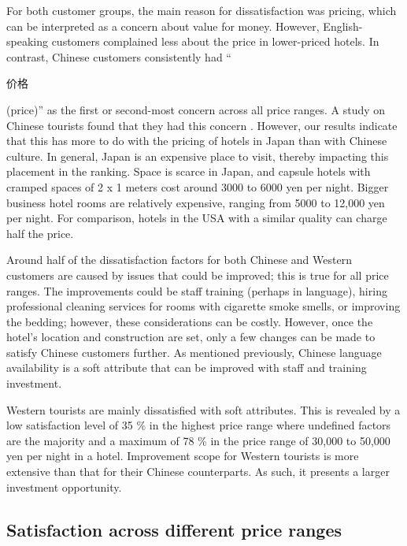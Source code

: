 \documentclass[smallextended,natbib]{svjour3}       %
\begin{document}
    For both customer groups, the main reason for dissatisfaction was pricing, which can be interpreted as a concern about value for money. However, English-speaking customers complained less about the price in lower-priced hotels. In contrast, Chinese customers consistently had ``\begin{CJK}{UTF8}{gbsn}价格\end{CJK} (price)'' as the first or second-most concern across all price ranges. A study on Chinese tourists found that they had this concern \cite[][]{truong2009}. However, our results indicate that this has more to do with the pricing of hotels in Japan than with Chinese culture. In general, Japan is an expensive place to visit, thereby impacting this placement in the ranking. Space is scarce in Japan, and capsule hotels with cramped spaces of 2 x 1 meters cost around 3000 to 6000 yen per night. Bigger business hotel rooms are relatively expensive, ranging from 5000 to 12,000 yen per night. For comparison, hotels in the USA with a similar quality can charge half the price.

    Around half of the dissatisfaction factors for both Chinese and Western customers are caused by issues that could be improved; this is true for all price ranges. The improvements could be staff training (perhaps in language), hiring professional cleaning services for rooms with cigarette smoke smells, or improving the bedding; however, these considerations can be costly. However, once the hotel's location and construction are set, only a few changes can be made to satisfy Chinese customers further. As mentioned previously, Chinese language availability is a soft attribute that can be improved with staff and training investment.

    Western tourists are mainly dissatisfied with soft attributes. This is revealed by a low satisfaction level of 35 \% in the highest price range where undefined factors are the majority and a maximum of 78 \% in the price range of 30,000 to 50,000 yen per night in a hotel. Improvement scope for Western tourists is more extensive than that for their Chinese counterparts. As such, it presents a larger investment opportunity. 

  \subsection{Satisfaction across different price ranges}\label{disc:price}
\end{document}

